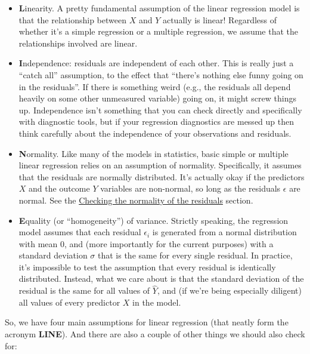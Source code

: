 \documentclass[
  a4paper,
]{book}
\providecommand{\tightlist}{%
  \setlength{\itemsep}{0pt}\setlength{\parskip}{0pt}}\usepackage{longtable,booktabs,array}
\begin{document}
\begin{itemize}
\tightlist
\item
  \textbf{L}inearity. A pretty fundamental assumption of the linear
  regression model is that the relationship between \(X\) and \(Y\)
  actually is linear! Regardless of whether it's a simple regression or
  a multiple regression, we assume that the relationships involved are
  linear.
\item
  \textbf{I}ndependence: residuals are independent of each other. This
  is really just a ``catch all'' assumption, to the effect that
  ``there's nothing else funny going on in the residuals''. If there is
  something weird (e.g., the residuals all depend heavily on some other
  unmeasured variable) going on, it might screw things up. Independence
  isn't something that you can check directly and specifically with
  diagnostic tools, but if your regression diagnostics are messed up
  then think carefully about the independence of your observations and
  residuals.
\item
  \textbf{N}ormality. Like many of the models in statistics, basic
  simple or multiple linear regression relies on an assumption of
  normality. Specifically, it assumes that the residuals are normally
  distributed. It's actually okay if the predictors \(X\) and the
  outcome \(Y\) variables are non-normal, so long as the residuals
  \(\epsilon\) are normal. See the
  \protect\hyperlink{sec-Checking-the-normality-of-the-residuals}{Checking
  the normality of the residuals} section.
\item
  \textbf{E}quality (or ``homogeneity'') of variance. Strictly speaking,
  the regression model assumes that each residual \(\epsilon_i\) is
  generated from a normal distribution with mean 0, and (more
  importantly for the current purposes) with a standard deviation
  \(\sigma\) that is the same for every single residual. In practice,
  it's impossible to test the assumption that every residual is
  identically distributed. Instead, what we care about is that the
  standard deviation of the residual is the same for all values of
  \(\hat{Y}\), and (if we're being especially diligent) all values of
  every predictor \(X\) in the model.
\end{itemize}

So, we have four main assumptions for linear regression (that neatly
form the acronym \textbf{LINE}). And there are also a couple of other
things we should also check for:
\end{document}
